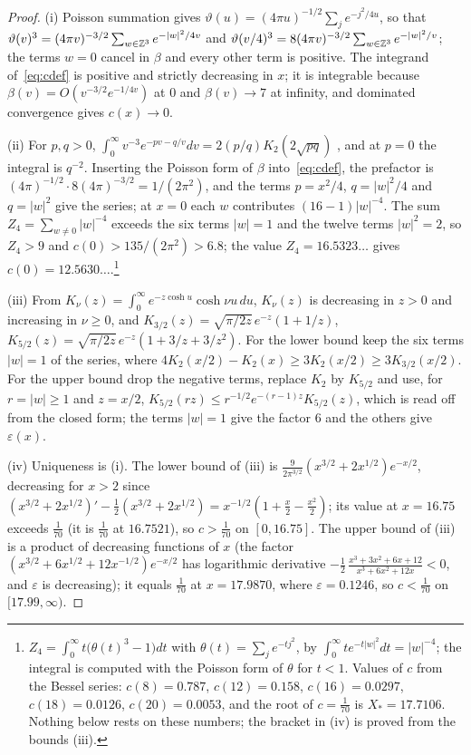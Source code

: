 \begin{proof}
(i) Poisson summation gives $\vartheta(u)=(4\pi u)^{-1/2}\sum_{j}e^{-j^2/4u}$,
so that $\vartheta(v)^3=(4\pi v)^{-3/2}\sum_{w\in\mathbb{Z}^3}e^{-|w|^2/4v}$ and
$\vartheta(v/4)^3=8(4\pi v)^{-3/2}\sum_{w\in\mathbb{Z}^3}e^{-|w|^2/v}$; the terms
$w=0$ cancel in $\beta$ and every other term is positive. The integrand
of~\eqref{eq:cdef} is positive and strictly decreasing in $x$; it is
integrable because $\beta(v)=O(v^{-3/2}e^{-1/4v})$ at $0$ and $\beta(v)\to7$
at infinity, and dominated convergence gives $c(x)\to0$.

(ii) For $p,q>0$, $\int_0^\infty v^{-3}e^{-pv-q/v}dv=2(p/q)K_2(2\sqrt{pq})$
\cite[\S6.22]{Wat44}, and at $p=0$ the integral is $q^{-2}$. Inserting the
Poisson form of $\beta$ into~\eqref{eq:cdef}, the prefactor is $(4\pi)^{-1/2}
\cdot8(4\pi)^{-3/2}=1/(2\pi^2)$, and the terms $p=x^2/4$, $q=|w|^2/4$ and $q=
|w|^2$ give the series; at $x=0$ each $w$ contributes $(16-1)|w|^{-4}$. The
sum $Z_4=\sum_{w\ne0}|w|^{-4}$ exceeds the six terms $|w|=1$ and the twelve
terms $|w|^2=2$, so $Z_4>9$ and $c(0)>135/(2\pi^2)>6.8$; the value
$Z_4=16.5323\ldots$ gives $c(0)=12.5630\ldots$.\footnote{$Z_4=\int_0^\infty t
\bigl(\theta(t)^3-1\bigr)dt$ with $\theta(t)=\sum_je^{-tj^2}$, by $\int_0^
\infty te^{-t|w|^2}dt=|w|^{-4}$; the integral is computed with the Poisson
form of $\theta$ for $t<1$. Values of $c$ from the Bessel series: $c(8)=
0.787$, $c(12)=0.158$, $c(16)=0.0297$, $c(18)=0.0126$, $c(20)=0.0053$, and
the root of $c=\frac1{70}$ is $X_*=17.7106$. Nothing below rests on these
numbers; the bracket in (iv) is proved from the bounds (iii).}

(iii) From $K_\nu(z)=\int_0^\infty e^{-z\cosh u}\cosh\nu u\,du$, $K_\nu(z)$ is
decreasing in $z>0$ and increasing in $\nu\ge0$, and $K_{3/2}(z)=\sqrt{\pi/2z}
\,e^{-z}(1+1/z)$, $K_{5/2}(z)=\sqrt{\pi/2z}\,e^{-z}(1+3/z+3/z^2)$. For the
lower bound keep the six terms $|w|=1$ of the series, where $4K_2(x/2)-
K_2(x)\ge3K_2(x/2)\ge3K_{3/2}(x/2)$. For the upper bound drop the negative
terms, replace $K_2$ by $K_{5/2}$ and use, for $r=|w|\ge1$ and $z=x/2$,
$K_{5/2}(rz)\le r^{-1/2}e^{-(r-1)z}K_{5/2}(z)$, which is read off from the
closed form; the terms $|w|=1$ give the factor $6$ and the others give
$\varepsilon(x)$.

(iv) Uniqueness is (i). The lower bound of (iii) is $\frac9{2\pi^{3/2}}(x^{3/2}+
2x^{1/2})e^{-x/2}$, decreasing for $x>2$ since $(x^{3/2}+2x^{1/2})'-\frac12
(x^{3/2}+2x^{1/2})=x^{-1/2}(1+\frac x2-\frac{x^2}2)$; its value at $x=16.75$
exceeds $\frac1{70}$ (it is $\frac1{70}$ at $16.7521$), so $c>\frac1{70}$ on
$[0,16.75]$. The upper bound of (iii) is a product of decreasing functions of
$x$ (the factor $(x^{3/2}+6x^{1/2}+12x^{-1/2})e^{-x/2}$ has logarithmic
derivative $-\frac12\,\frac{x^3+3x^2+6x+12}{x^3+6x^2+12x}<0$, and
$\varepsilon$ is decreasing); it equals $\frac1{70}$ at $x=17.9870$, where
$\varepsilon=0.1246$, so $c<\frac1{70}$ on $[17.99,\infty)$.
\end{proof}

